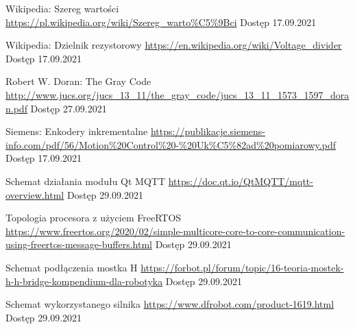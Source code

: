 \begin{thebibliography}{9}
        Wikipedia: Szereg wartości  \newline
        \url{https://pl.wikipedia.org/wiki/Szereg_warto\%C5\%9Bci} \newline
        Dostęp 17.09.2021
    
        Wikipedia: Dzielnik rezystorowy  \newline
        \url{https://en.wikipedia.org/wiki/Voltage\_divider} \newline
        Dostęp 17.09.2021
        
        Robert W. Doran: The Gray Code  \newline
        \url{http://www.jucs.org/jucs_13_11/the_gray_code/jucs_13_11_1573_1597_doran.pdf} \newline
        Dostęp 27.09.2021
        
        Siemens: Enkodery inkrementalne  \newline
        \url{https://publikacje.siemens-info.com/pdf/56/Motion\%20Control\%20-\%20Uk\%C5\%82ad\%20pomiarowy.pdf} \newline
        Dostęp 17.09.2021
        
        
        
        
        Schemat działania modułu Qt MQTT  \newline
        \url{https://doc.qt.io/QtMQTT/mqtt-overview.html} \newline
        Dostęp 29.09.2021        
         
        Topologia procesora z użyciem FreeRTOS  \newline
        \url{https://www.freertos.org/2020/02/simple-multicore-core-to-core-communication-using-freertos-message-buffers.html} \newline
        Dostęp 29.09.2021     
        
        Schemat podłączenia mostka H  \newline
        \url{https://forbot.pl/forum/topic/16-teoria-mostek-h-h-bridge-kompendium-dla-robotyka} \newline
        Dostęp 29.09.2021         
        
        Schemat wykorzystanego silnika  \newline
        \url{https://www.dfrobot.com/product-1619.html} \newline
        Dostęp 29.09.2021
                

\end{thebibliography}
